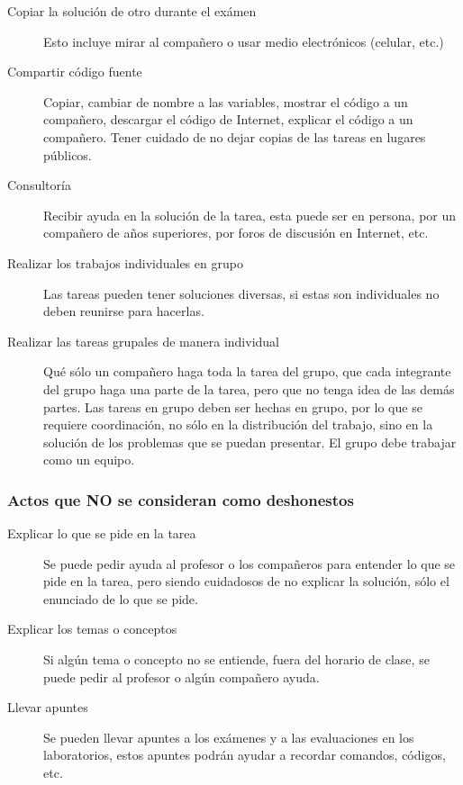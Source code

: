 \documentclass{article}
\begin{document}
\begin{requirements}
\begin{description}
\item [Copiar la solución de otro durante el exámen] Esto incluye mirar al compañero o usar medio electrónicos (celular, etc.)
\item [Compartir código fuente] Copiar, cambiar de nombre a las variables, mostrar el código a un compañero, descargar el código de Internet, explicar el código a un compañero. Tener cuidado de no dejar copias de las tareas en lugares públicos.
\item[Consultoría] Recibir ayuda en la solución de la tarea, esta puede ser en persona, por un compañero de años superiores, por foros de discusión en Internet, etc.
\item[Realizar los trabajos individuales en grupo] Las tareas pueden tener soluciones diversas, si estas son individuales no deben reunirse para hacerlas.
\item[Realizar las tareas grupales de manera individual] Qué sólo un compañero haga toda la tarea del grupo, que cada integrante del grupo haga una parte de la tarea, pero que no tenga idea de las demás partes. Las tareas en grupo deben ser hechas en grupo, por lo que se requiere coordinación, no sólo en la distribución del trabajo, sino en la solución de los problemas que se puedan presentar. El grupo debe trabajar como un equipo.
\end{description}

\subsubsection*{Actos que NO se consideran como deshonestos}
\begin{description}
\item[Explicar lo que se pide en la tarea] Se puede pedir ayuda al profesor o los compañeros para entender lo que se pide en la tarea, pero siendo cuidadosos de no explicar la solución, sólo el enunciado de lo que se pide.
\item[Explicar los temas o conceptos] Si algún tema o concepto no se entiende, fuera del horario de clase, se puede pedir al profesor o algún compañero ayuda.
\item[Llevar apuntes] Se pueden llevar apuntes a los exámenes y a las evaluaciones en los laboratorios, estos apuntes podrán ayudar a recordar comandos, códigos, etc.
\end{description}

\end{requirements}

\begin{bibliografia}
\end{bibliografia}

\end{document}

